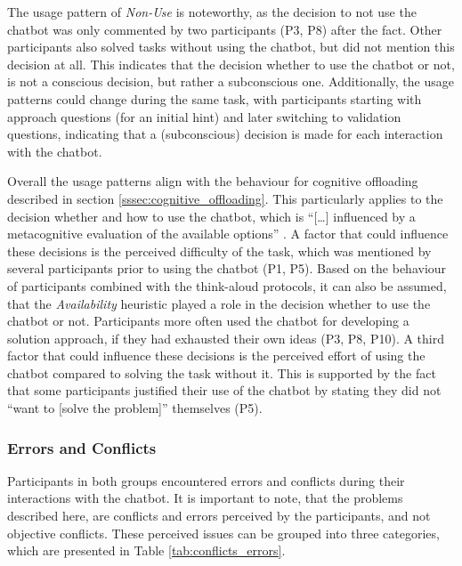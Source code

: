 The usage pattern of \textit{Non-Use} is noteworthy, as the decision to not use the chatbot was only commented by two participants (P3, P8) after the fact. Other participants also solved tasks without using the chatbot, but did not mention this decision at all. This indicates that the decision whether to use the chatbot or not, is not a conscious decision, but rather a subconscious one. Additionally, the usage patterns could change during the same task, with participants starting with approach questions (for an initial hint) and later switching to validation questions, indicating that a (subconscious) decision is made for each interaction with the chatbot.

Overall the usage patterns align with the behaviour for cognitive offloading described in section \ref{sssec:cognitive_offloading}. This particularly applies to the decision whether and how to use the chatbot, which is “[\dots] influenced by a metacognitive evaluation of the available options” \parencite{Risko2015}. A factor that could influence these decisions is the perceived difficulty of the task, which was mentioned by several participants prior to using the chatbot (P1, P5). Based on the behaviour of participants combined with the think-aloud protocols, it can also be assumed, that the \textit{Availability} heuristic \parencite{Tversky1974} played a role in the decision whether to use the chatbot or not. Participants more often used the chatbot for developing a solution approach, if they had exhausted their own ideas (P3, P8, P10). A third factor that could influence these decisions is the perceived effort of using the chatbot compared to solving the task without it. This is supported by the fact that some participants justified their use of the chatbot by stating they did not “want to [solve the problem]” themselves (P5).

\subsubsection{Errors and Conflicts} \label{sssec:errors_conflicts}

Participants in both groups encountered errors and conflicts during their interactions with the chatbot. It is important to note, that the problems described here, are conflicts and errors perceived by the participants, and not objective conflicts. These perceived issues can be grouped into three categories, which are presented in Table \ref{tab:conflicts_errors}.


